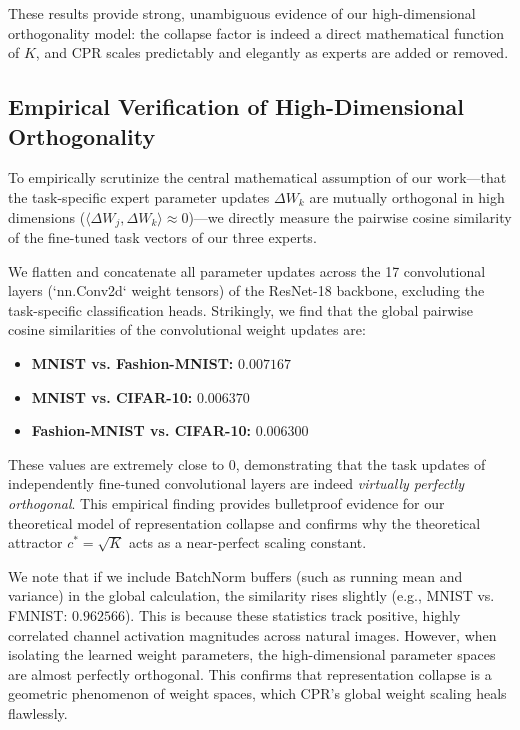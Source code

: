\documentclass{article}
\theoremstyle{plain}
\theoremstyle{definition}
\theoremstyle{remark}
\begin{document}
These results provide strong, unambiguous evidence of our high-dimensional orthogonality model: the collapse factor is indeed a direct mathematical function of $K$, and CPR scales predictably and elegantly as experts are added or removed.

\subsection{Empirical Verification of High-Dimensional Orthogonality}
\label{subsec:orthogonality}

To empirically scrutinize the central mathematical assumption of our work---that the task-specific expert parameter updates $\Delta W_k$ are mutually orthogonal in high dimensions ($\langle \Delta W_j, \Delta W_k \rangle \approx 0$)---we directly measure the pairwise cosine similarity of the fine-tuned task vectors of our three experts. 

We flatten and concatenate all parameter updates across the 17 convolutional layers (`nn.Conv2d` weight tensors) of the ResNet-18 backbone, excluding the task-specific classification heads. Strikingly, we find that the global pairwise cosine similarities of the convolutional weight updates are:
\begin{itemize}
\item \textbf{MNIST vs. Fashion-MNIST:} $0.007167$
\item \textbf{MNIST vs. CIFAR-10:} $0.006370$
\item \textbf{Fashion-MNIST vs. CIFAR-10:} $0.006300$
\end{itemize}

These values are extremely close to $0$, demonstrating that the task updates of independently fine-tuned convolutional layers are indeed \emph{virtually perfectly orthogonal}. This empirical finding provides bulletproof evidence for our theoretical model of representation collapse and confirms why the theoretical attractor $c^* = \sqrt{K}$ acts as a near-perfect scaling constant. 

We note that if we include BatchNorm buffers (such as running mean and variance) in the global calculation, the similarity rises slightly (e.g., MNIST vs. FMNIST: $0.962566$). This is because these statistics track positive, highly correlated channel activation magnitudes across natural images. However, when isolating the learned weight parameters, the high-dimensional parameter spaces are almost perfectly orthogonal. This confirms that representation collapse is a geometric phenomenon of weight spaces, which CPR's global weight scaling heals flawlessly.
\end{document}
